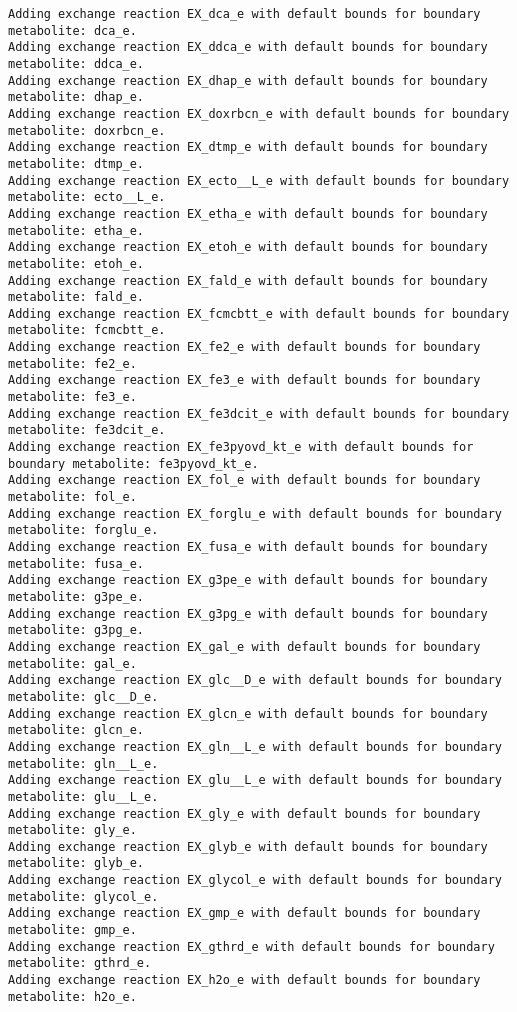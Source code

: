 \documentclass[
  letterpaper,
  DIV=11,
  numbers=noendperiod]{scrartcl}
\begin{document}
\begin{verbatim}
Adding exchange reaction EX_dca_e with default bounds for boundary metabolite: dca_e.
Adding exchange reaction EX_ddca_e with default bounds for boundary metabolite: ddca_e.
Adding exchange reaction EX_dhap_e with default bounds for boundary metabolite: dhap_e.
Adding exchange reaction EX_doxrbcn_e with default bounds for boundary metabolite: doxrbcn_e.
Adding exchange reaction EX_dtmp_e with default bounds for boundary metabolite: dtmp_e.
Adding exchange reaction EX_ecto__L_e with default bounds for boundary metabolite: ecto__L_e.
Adding exchange reaction EX_etha_e with default bounds for boundary metabolite: etha_e.
Adding exchange reaction EX_etoh_e with default bounds for boundary metabolite: etoh_e.
Adding exchange reaction EX_fald_e with default bounds for boundary metabolite: fald_e.
Adding exchange reaction EX_fcmcbtt_e with default bounds for boundary metabolite: fcmcbtt_e.
Adding exchange reaction EX_fe2_e with default bounds for boundary metabolite: fe2_e.
Adding exchange reaction EX_fe3_e with default bounds for boundary metabolite: fe3_e.
Adding exchange reaction EX_fe3dcit_e with default bounds for boundary metabolite: fe3dcit_e.
Adding exchange reaction EX_fe3pyovd_kt_e with default bounds for boundary metabolite: fe3pyovd_kt_e.
Adding exchange reaction EX_fol_e with default bounds for boundary metabolite: fol_e.
Adding exchange reaction EX_forglu_e with default bounds for boundary metabolite: forglu_e.
Adding exchange reaction EX_fusa_e with default bounds for boundary metabolite: fusa_e.
Adding exchange reaction EX_g3pe_e with default bounds for boundary metabolite: g3pe_e.
Adding exchange reaction EX_g3pg_e with default bounds for boundary metabolite: g3pg_e.
Adding exchange reaction EX_gal_e with default bounds for boundary metabolite: gal_e.
Adding exchange reaction EX_glc__D_e with default bounds for boundary metabolite: glc__D_e.
Adding exchange reaction EX_glcn_e with default bounds for boundary metabolite: glcn_e.
Adding exchange reaction EX_gln__L_e with default bounds for boundary metabolite: gln__L_e.
Adding exchange reaction EX_glu__L_e with default bounds for boundary metabolite: glu__L_e.
Adding exchange reaction EX_gly_e with default bounds for boundary metabolite: gly_e.
Adding exchange reaction EX_glyb_e with default bounds for boundary metabolite: glyb_e.
Adding exchange reaction EX_glycol_e with default bounds for boundary metabolite: glycol_e.
Adding exchange reaction EX_gmp_e with default bounds for boundary metabolite: gmp_e.
Adding exchange reaction EX_gthrd_e with default bounds for boundary metabolite: gthrd_e.
Adding exchange reaction EX_h2o_e with default bounds for boundary metabolite: h2o_e.

\end{verbatim}
\end{document}
